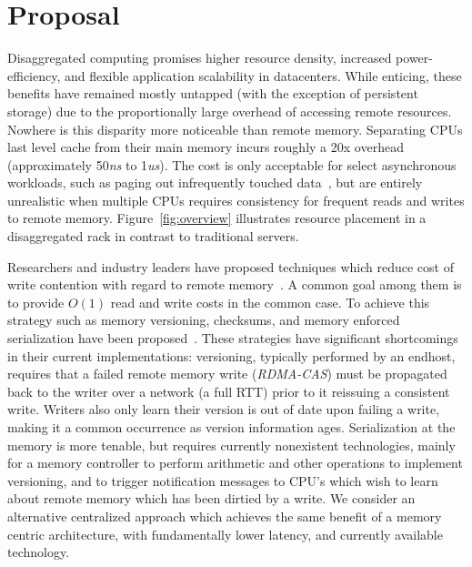 \section{Proposal}
\label{sec:intro}

Disaggregated computing promises higher resource density, increased
power-efficiency, and flexible application scalability in datacenters.
While enticing, these benefits have remained mostly untapped (with the
exception of persistent storage) due to the proportionally large
overhead of accessing remote resources. Nowhere is this disparity more
noticeable than remote memory. Separating CPUs last level cache from
their main memory incurs roughly a 20x overhead (approximately
50\textit{ns} to 1\textit{us}).  The cost is only acceptable for
select asynchronous workloads, such as paging out infrequently touched
data~\cite{gms}, but are entirely unrealistic when multiple CPUs
requires consistency for frequent reads and writes to remote memory.
Figure~\ref{fig:overview} illustrates resource placement in a
disaggregated rack in contrast to traditional servers.

Researchers and industry leaders have proposed techniques which reduce
cost of write contention with regard to remote
memory~\cite{aguilera2019designing,cell,sonuma,storm,clover}. A common
goal among them is to provide $O(1)$ read and write costs in the
common case. To achieve this strategy such as memory versioning,
checksums, and memory enforced serialization have been
proposed~\cite{aguilera2019designing}. These strategies have
significant shortcomings in their current implementations: versioning,
typically performed by an endhost, requires that a failed remote
memory write (\textit{RDMA-CAS})  must be propagated back to the
writer over a network (a full RTT) prior to it reissuing a consistent
write. Writers also only learn their version is out of date upon
failing a write, making it a common occurrence as version information
ages.  Serialization at the memory is more tenable, but requires
currently nonexistent technologies, mainly for a memory controller to
perform arithmetic and other operations to implement versioning, and
to trigger notification messages to CPU's which wish to learn about
remote memory which has been dirtied by a write. We consider an
alternative centralized approach which achieves the same benefit of a
memory centric architecture, with fundamentally lower latency, and
currently available technology. 




